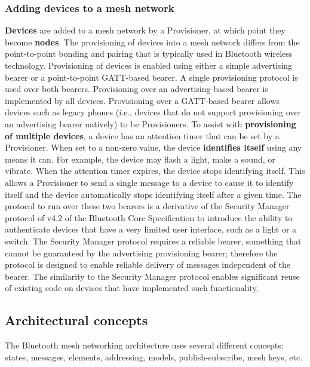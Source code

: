 \documentclass[\main/main.tex]{subfiles}
\begin{document}
\subsubsection{Adding devices to a mesh network}
\textbf{Devices} are added to a mesh network by a Provisioner, at which point they become \textbf{nodes}. The provisioning of devices into a mesh network differs from the point-to-point bonding and pairing that is typically used in Bluetooth wireless technology. Provisioning of devices is enabled using either a simple advertising bearer or a point-to-point GATT-based bearer. A single provisioning protocol is used over both bearers. Provisioning over an advertising-based bearer is implemented by all devices. Provisioning over a GATT-based bearer allows devices such as legacy phones (i.e., devices that do not support provisioning over an advertising bearer natively) to be Provisioners.
\newline\newline
To assist with \textbf{provisioning of multiple devices}, a device has an attention timer that can be set by a Provisioner. When set to a non-zero value, the device \textbf{identifies itself} using any means it can. For example, the device may flash a light, make a sound, or vibrate. When the attention timer expires, the device stops identifying itself. This allows a Provisioner to send a single message to a device to cause it to identify itself and the device automatically stops identifying itself after a given time.
\newline\newline
The protocol to run over these two bearers is a derivative of the Security Manager protocol of v4.2 of the Bluetooth Core Specification to introduce the ability to authenticate devices that have a very limited user interface, such as a light or a switch. The Security Manager protocol requires a reliable bearer, something that cannot be guaranteed by the advertising provisioning bearer; therefore the protocol is designed to enable reliable delivery of messages independent of the bearer. The similarity to the Security Manager protocol enables significant reuse of existing code on devices that have implemented such functionality.

\subsection{Architectural concepts}
The Bluetooth mesh networking architecture uses several different concepts: states, messages, elements, addressing, models, publish-subscribe, mesh keys, etc.
\end{document}
